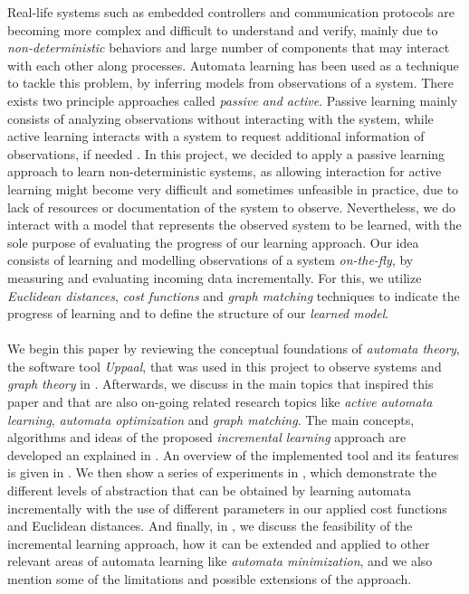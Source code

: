 Real-life systems such as embedded controllers and communication protocols are becoming more complex and difficult to understand and verify, mainly due to \textit{non-deterministic} behaviors and large number of components that may interact with each other along processes.
%
Automata learning has been used as a technique to tackle this problem, by inferring models from observations of a system. There exists two principle approaches called \textit{passive and active}. Passive learning mainly consists of analyzing observations without interacting with the system, while active learning interacts with a system to request additional information of observations, if needed \cite{onlinePassiveLearning}. 
%
In this project, we decided to apply a passive learning approach to learn non-deterministic systems, as allowing interaction for active learning might become very difficult and sometimes unfeasible in practice, due to lack of resources or documentation of the system to observe. Nevertheless, we do interact with a model that represents the observed system to be learned, with the sole purpose of evaluating the progress of our learning approach. 
%
Our idea consists of learning and modelling observations of a system \textit{on-the-fly}, by measuring and evaluating incoming data incrementally. For this, we utilize \textit{Euclidean distances}, \textit{cost functions} and \textit{graph matching} techniques to indicate the progress of learning and to define the structure of our \textit{learned model}.\\ \\
%
We begin this paper by reviewing the conceptual foundations of \textit{automata theory}, the software tool \textit{Uppaal}, that was used in this project to observe systems and \textit{graph theory} in . 
%
Afterwards, we discuss in  the main topics that inspired this paper and that are also on-going related research topics like \textit{active automata learning}, \textit{automata optimization} and \textit{graph matching}. 
%
The main concepts, algorithms and ideas of the proposed \textit{incremental learning} approach are developed an explained in . An overview of the implemented tool and its features is given in . We then show a series of experiments in , which demonstrate the different levels of abstraction that can be obtained by learning automata incrementally with the use of different parameters in our applied cost functions and Euclidean distances. 
%
And finally, in , we discuss the feasibility of the incremental learning approach, how it can be extended and applied to other relevant areas of automata learning like \textit{automata minimization}, and we also mention some of the limitations and possible extensions of the approach. 
%

